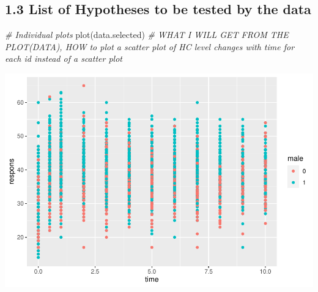 \documentclass[
]{article}
\newenvironment{Shaded}{\begin{snugshade}}{\end{snugshade}}
\newcommand{\AttributeTok}[1]{\textcolor[rgb]{0.77,0.63,0.00}{#1}}
\newcommand{\CommentTok}[1]{\textcolor[rgb]{0.56,0.35,0.01}{\textit{#1}}}
\newcommand{\DecValTok}[1]{\textcolor[rgb]{0.00,0.00,0.81}{#1}}
\newcommand{\FunctionTok}[1]{\textcolor[rgb]{0.00,0.00,0.00}{#1}}
\newcommand{\NormalTok}[1]{#1}
\newcommand{\OtherTok}[1]{\textcolor[rgb]{0.56,0.35,0.01}{#1}}
\newcommand{\SpecialCharTok}[1]{\textcolor[rgb]{0.00,0.00,0.00}{#1}}
\begin{document}
\hypertarget{list-of-hypotheses-to-be-tested-by-the-data}{%
\subsection{1.3 List of Hypotheses to be tested by the
data}\label{list-of-hypotheses-to-be-tested-by-the-data}}

\begin{Shaded}
\end{Shaded}

\begin{Shaded}
\begin{Highlighting}[]
\CommentTok{\# Individual plots}
\FunctionTok{plot}\NormalTok{(data.selected) }\CommentTok{\# WHAT I WILL GET FROM THE PLOT(DATA), HOW to plot a scatter plot of HC level changes with time for each id instead of a scatter plot}
\end{Highlighting}
\end{Shaded}

\includegraphics{LDA_Wan_files/figure-latex/unnamed-chunk-10-1.pdf}
\end{document}
